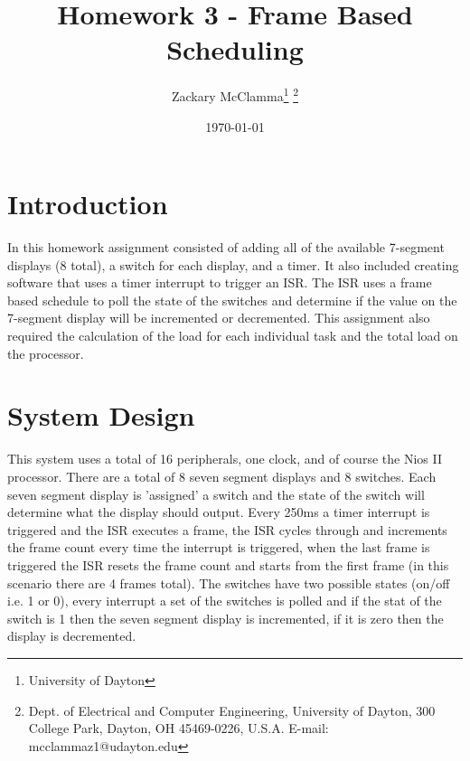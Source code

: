 \documentclass[10pt,a4paper]{article}
\begin{document}
	\title{Homework 3 - Frame Based Scheduling}
	\makeatletter
	
	\author{Zackary McClamma\thanks{University of Dayton}
		\thanks{Dept. of Electrical and Computer
			Engineering, University of Dayton, 300 College Park, Dayton, OH
			45469-0226, U.S.A. E-mail:
			mcclammaz1@udayton.edu}}
	
	\makeatother
	
	\date{\today}
	
	\maketitle
	\section{Introduction}
	In this homework assignment consisted of adding all of the available 7-segment displays (8 total), a switch for each display, and a timer. It also included creating software that uses a timer interrupt to trigger an ISR. The ISR uses a frame based schedule to poll the state of the switches and determine if the value on the 7-segment display will be incremented or decremented. This assignment also required the calculation of the load for each individual task and the total load on the processor.
	
	\section{System Design}
 	This system uses a total of 16 peripherals, one clock, and of course the Nios II processor. There are a total of 8 seven segment displays and 8 switches. Each seven segment display is 'assigned' a switch and the state of the switch will determine what the display should output. Every 250ms a timer interrupt is triggered and the ISR executes a frame, the ISR cycles through and increments the frame count every time the interrupt is triggered, when the last frame is triggered the ISR resets the frame count and starts from the first frame (in this scenario there are 4 frames total). The switches have two possible states (on/off i.e. 1 or 0), every interrupt a set of the switches is polled and if the stat of the switch is 1 then the seven segment display is incremented, if it is zero then the display is decremented.

	
\end{document}
